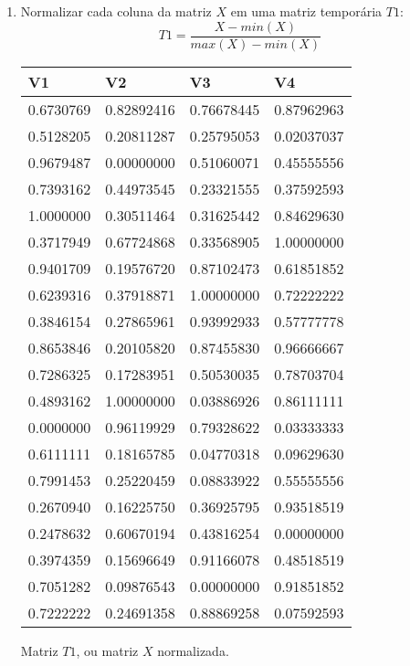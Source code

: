 \documentclass{article}
\begin{document}
            \begin{enumerate}

                \item Normalizar cada coluna da matriz $X$ em uma matriz temporária $T1$:
                    \[
                        T1=\frac{X-min(X)}{max(X)-min(X)}
                    \]

                    \begin{center}
                        \begin{tabular}{llll}
                            V1         & V2         & V3         & V4        \\
                            \hline
                            0.6730769 & 0.82892416 & 0.76678445 & 0.87962963 \\
                            0.5128205 & 0.20811287 & 0.25795053 & 0.02037037 \\
                            0.9679487 & 0.00000000 & 0.51060071 & 0.45555556 \\
                            0.7393162 & 0.44973545 & 0.23321555 & 0.37592593 \\
                            1.0000000 & 0.30511464 & 0.31625442 & 0.84629630 \\
                            0.3717949 & 0.67724868 & 0.33568905 & 1.00000000 \\
                            0.9401709 & 0.19576720 & 0.87102473 & 0.61851852 \\
                            0.6239316 & 0.37918871 & 1.00000000 & 0.72222222 \\
                            0.3846154 & 0.27865961 & 0.93992933 & 0.57777778 \\
                            0.8653846 & 0.20105820 & 0.87455830 & 0.96666667 \\
                            0.7286325 & 0.17283951 & 0.50530035 & 0.78703704 \\
                            0.4893162 & 1.00000000 & 0.03886926 & 0.86111111 \\
                            0.0000000 & 0.96119929 & 0.79328622 & 0.03333333 \\
                            0.6111111 & 0.18165785 & 0.04770318 & 0.09629630 \\
                            0.7991453 & 0.25220459 & 0.08833922 & 0.55555556 \\
                            0.2670940 & 0.16225750 & 0.36925795 & 0.93518519 \\
                            0.2478632 & 0.60670194 & 0.43816254 & 0.00000000 \\
                            0.3974359 & 0.15696649 & 0.91166078 & 0.48518519 \\
                            0.7051282 & 0.09876543 & 0.00000000 & 0.91851852 \\
                            0.7222222 & 0.24691358 & 0.88869258 & 0.07592593
                        \end{tabular}\par
                        Matriz $T1$, ou matriz $X$ normalizada.
                    \end{center}


\end{enumerate}
\end{document}
